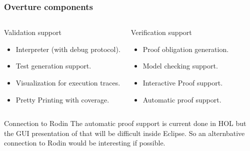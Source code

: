 \begin{frame}
	\frametitle{Overture components}
	\begin{columns}
			\begin{block}{Validation support}
				{\scriptsize\begin{itemize}
				  \item Interpreter (with debug protocol).
				  \item Test generation support.
				  \item Visualization for execution traces.      
				  \item Pretty Printing with coverage.
				\end{itemize}}
			\end{block}
			\begin{block}{Verification support}
				{\scriptsize\begin{itemize}
					\item Proof obligation generation.
					\item Model checking support.
					\item Interactive Proof support.
					\item Automatic proof support.      
				\end{itemize}}
			\end{block}
		\end{columns}

%
%
%
%

\begin{beamerboxesrounded}[upper=uppercol,lower=lowercol,shadow=true]{Connection to Rodin}
The automatic proof support is current done in HOL but the GUI presentation of that will be difficult inside Eclipse. So an alternbative connection to Rodin would be interesting if possible.
\end{beamerboxesrounded}

\end{frame}

